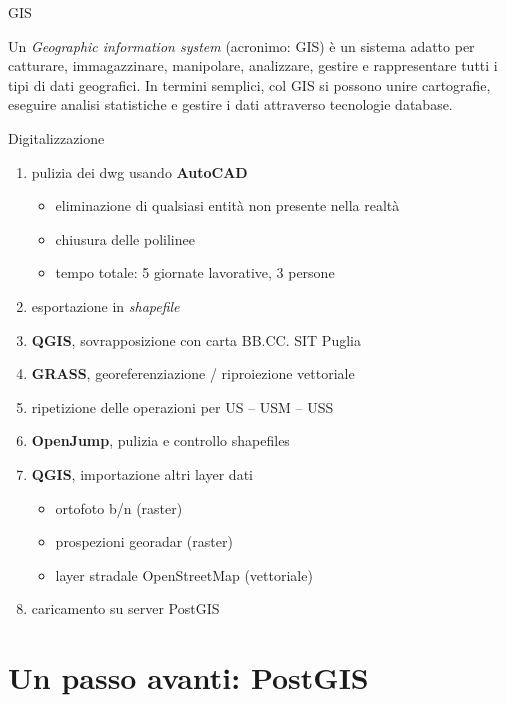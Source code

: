 \documentclass{beamer}
\begin{document}
		\begin{frame}{GIS}
			\begin{center}
				Un \emph{Geographic information system} (acronimo: GIS) è un sistema adatto per catturare, immagazzinare, manipolare, analizzare, gestire e rappresentare tutti i tipi di dati geografici.\vfill
				In termini semplici, col GIS si possono unire cartografie, eseguire analisi statistiche e gestire i dati attraverso tecnologie database.
			\end{center}
		\end{frame}

		\begin{frame}{Digitalizzazione}
			\begin{enumerate}
				\item pulizia dei dwg usando \textbf{AutoCAD}
				\begin{itemize}
					\item eliminazione di qualsiasi entità non presente nella realtà
					\item chiusura delle polilinee
					\item tempo totale: 5 giornate lavorative, 3 persone
				\end{itemize}
				\item esportazione in \emph{shapefile}
				\hline
				\item \textbf{QGIS}, sovrapposizione con carta BB.CC. SIT Puglia 
				\hline
				\item \textbf{GRASS}, georeferenziazione / riproiezione vettoriale
				\item ripetizione delle operazioni per US -- USM -- USS
				\hline
				\item \textbf{OpenJump}, pulizia e controllo shapefiles
				\hline
				\item \textbf{QGIS}, importazione altri layer dati
				\begin{itemize}
					\item ortofoto b/n (raster)
					\item prospezioni georadar (raster)
					\item layer stradale OpenStreetMap (vettoriale)
				\end{itemize}
				\item caricamento su server PostGIS
			\end{enumerate}
		\end{frame}

	\section{Un passo avanti: PostGIS}
\end{document}
